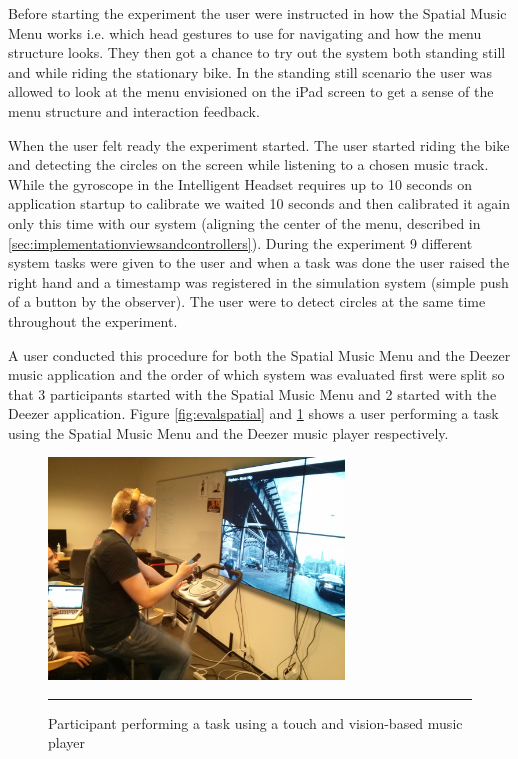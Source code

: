 Before starting the experiment the user were instructed in how the Spatial Music Menu works i.e. which head gestures to use for navigating and how the menu structure looks. They then got a chance to try out the system both standing still and while riding the stationary bike. In the standing still scenario the user was allowed to look at the menu envisioned on the iPad screen to get a sense of the menu structure and interaction feedback.

When the user felt ready the experiment started. The user started riding the bike and detecting the circles on the screen while listening to a chosen music track. While the gyroscope in the Intelligent Headset requires up to 10 seconds on application startup to calibrate we waited 10 seconds and then calibrated it again only this time with our system (aligning the center of the menu, described in \ref{sec:implementationviewsandcontrollers}). During the experiment 9 different system tasks were given to the user and when a task was done the user raised the right hand and a timestamp was registered in the simulation system (simple push of a button by the observer). The user were to detect circles at the same time throughout the experiment.

A user conducted this procedure for both the Spatial Music Menu and the Deezer music application and the order of which system was evaluated first were split so that 3 participants started with the Spatial Music Menu and 2 started with the Deezer application. Figure \ref{fig:evalspatial} and \ref{fig:evalnormal} shows a user performing a task using the Spatial Music Menu and the Deezer music player respectively.

\begin{figure}[t]
	\centering
		\includegraphics[width=0.7\textwidth,height=\textheight,keepaspectratio]{./Figures/evaluation_normal.jpg}
		\rule{35em}{1pt}
	\caption[Evaluation touch and vision-based interface]{Participant performing a task using a touch and vision-based music player}
	\label{fig:evalnormal}
\end{figure}

